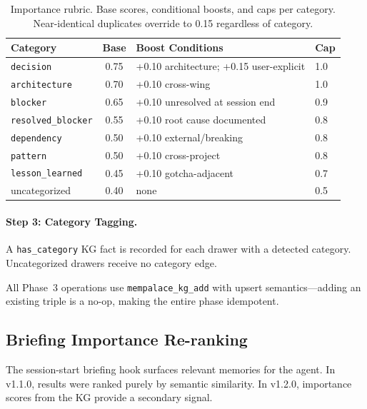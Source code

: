\documentclass[11pt]{article}
\begin{document}
\begin{table}[H]
\centering
\caption{Importance rubric. Base scores, conditional boosts, and caps
per category. Near-identical duplicates override to 0.15 regardless of
category.}
\label{tab:importance-rubric}
\begin{tabular}{@{}lcll@{}}
\toprule
\textbf{Category} & \textbf{Base} & \textbf{Boost Conditions} & \textbf{Cap} \\
\midrule
\texttt{decision}          & 0.75 & +0.10 architecture; +0.15 user-explicit & 1.0 \\
\texttt{architecture}      & 0.70 & +0.10 cross-wing                       & 1.0 \\
\texttt{blocker}           & 0.65 & +0.10 unresolved at session end         & 0.9 \\
\texttt{resolved\_blocker} & 0.55 & +0.10 root cause documented             & 0.8 \\
\texttt{dependency}        & 0.50 & +0.10 external/breaking                 & 0.8 \\
\texttt{pattern}           & 0.50 & +0.10 cross-project                     & 0.8 \\
\texttt{lesson\_learned}   & 0.45 & +0.10 gotcha-adjacent                   & 0.7 \\
uncategorized              & 0.40 & none                                     & 0.5 \\
\bottomrule
\end{tabular}
\end{table}

\paragraph{Step 3: Category Tagging.}
A \texttt{has\_category} KG fact is recorded for each drawer with a
detected category. Uncategorized drawers receive no category edge.

All Phase~3 operations use \texttt{mempalace\_kg\_add} with upsert
semantics---adding an existing triple is a no-op, making the entire
phase idempotent.

\subsection{Briefing Importance Re-ranking}

The session-start briefing hook surfaces relevant memories for the
agent. In v1.1.0, results were ranked purely by semantic similarity.
In v1.2.0, importance scores from the KG provide a secondary signal.
\end{document}
